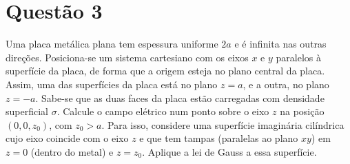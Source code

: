 \documentclass[11pt]{article}
\begin{document}
\section{Questão 3}
\label{sec:org95a475c}
Uma placa metálica plana tem espessura uniforme \(2a\) e é infinita nas
outras direções. Posiciona-se um sistema cartesiano com os eixos \(x\) e
\(y\) paralelos à superfície da placa, de forma que a origem esteja no
plano central da placa. Assim, uma das superfícies da placa está no
plano \(z=a\), e a outra, no plano \(z = -a\). Sabe-se que as duas faces da
placa estão carregadas com densidade superficial \(\sigma\). Calcule o campo
elétrico num ponto sobre o eixo \(z\) na posição \((0,0,z_0)\), com \(z_0
>a\). Para isso, considere uma superfície imaginária cilíndrica cujo eixo
coincide com o eixo \(z\) e que tem tampas (paralelas ao plano \(xy\)) em
\(z=0\) (dentro do metal) e \(z=z_0\). Aplique a lei de Gauss a essa
superfície. 
\end{document}
